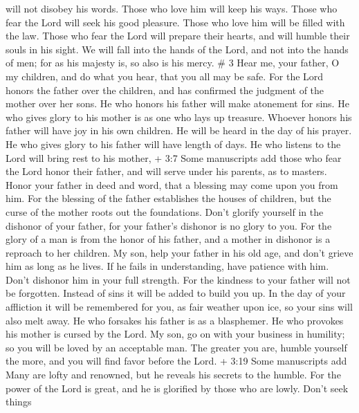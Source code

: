 will not disobey his words. Those who love him will keep his ways.
 Those who fear the Lord will seek his good pleasure. Those
who love him will be filled with the law.  Those who fear
the Lord will prepare their hearts, and will humble their souls in his
sight.  We will fall into the hands of the Lord, and not
into the hands of men; for as his majesty is, so also is his mercy. \# 3
 Hear me, your father, O my children, and do what you hear,
that you all may be safe.  For the Lord honors the father
over the children, and has confirmed the judgment of the mother over her
sons.  He who honors his father will make atonement for
sins.  He who gives glory to his mother is as one who lays
up treasure.  Whoever honors his father will have joy in his
own children. He will be heard in the day of his prayer.  He
who gives glory to his father will have length of days. He who listens
to the Lord will bring rest to his mother,  + 3:7 Some
manuscripts add those who fear the Lord honor their father, and will
serve under his parents, as to masters.  Honor your father
in deed and word, that a blessing may come upon you from him.
 For the blessing of the father establishes the houses of
children, but the curse of the mother roots out the foundations.
 Don't glorify yourself in the dishonor of your father, for
your father's dishonor is no glory to you.  For the glory
of a man is from the honor of his father, and a mother in dishonor is a
reproach to her children.  My son, help your father in his
old age, and don't grieve him as long as he lives.  If he
fails in understanding, have patience with him. Don't dishonor him in
your full strength.  For the kindness to your father will
not be forgotten. Instead of sins it will be added to build you up.
 In the day of your affliction it will be remembered for
you, as fair weather upon ice, so your sins will also melt away.
 He who forsakes his father is as a blasphemer. He who
provokes his mother is cursed by the Lord.  My son, go on
with your business in humility; so you will be loved by an acceptable
man.  The greater you are, humble yourself the more, and
you will find favor before the Lord.  + 3:19 Some
manuscripts add Many are lofty and renowned, but he reveals his secrets
to the humble.  For the power of the Lord is great, and he
is glorified by those who are lowly.  Don't seek things
